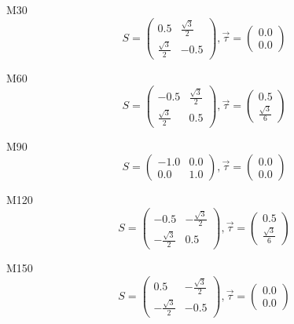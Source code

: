 \documentclass[12pt, fleqn]{article}
\begin{document}
M30
\begin{equation}
    S=
    \begin{pmatrix}
        0.5&\frac{\sqrt{3}}{2}\\
        \frac{\sqrt{3}}{2}&-0.5
    \end{pmatrix}
    ,\vec{\tau}=
    \begin{pmatrix}
        0.0\\
        0.0
    \end{pmatrix}
    \label{M30}
\end{equation}

M60
\begin{equation}
    S=
    \begin{pmatrix}
        -0.5&\frac{\sqrt{3}}{2}\\
        \frac{\sqrt{3}}{2}&0.5
    \end{pmatrix}
    ,\vec{\tau}=
    \begin{pmatrix}
        0.5\\
        \frac{\sqrt{3}}{6}
    \end{pmatrix}
    \label{M60}
\end{equation}

M90
\begin{equation}
    S=
    \begin{pmatrix}
        -1.0&0.0\\
        0.0&1.0
    \end{pmatrix}
    ,\vec{\tau}=
    \begin{pmatrix}
        0.0\\
        0.0
    \end{pmatrix}
    \label{M90}
\end{equation}

M120
\begin{equation}
    S=
    \begin{pmatrix}
        -0.5&-\frac{\sqrt{3}}{2}\\
        -\frac{\sqrt{3}}{2}&0.5
    \end{pmatrix}
    ,\vec{\tau}=
    \begin{pmatrix}
        0.5\\
        \frac{\sqrt{3}}{6}
    \end{pmatrix}
    \label{M120}
\end{equation}

M150
\begin{equation}
    S=
    \begin{pmatrix}
        0.5&-\frac{\sqrt{3}}{2}\\
        -\frac{\sqrt{3}}{2}&-0.5
    \end{pmatrix}
    ,\vec{\tau}=
    \begin{pmatrix}
        0.0\\
        0.0
    \end{pmatrix}
    \label{M150}
\end{equation}
\end{document}

